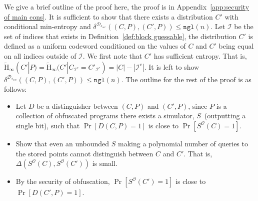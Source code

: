 \documentclass[11pt]{article}
\newcommand{\apref}[1]{\mbox{Appendix~\ref{#1}}}
\newcommand{\defref}[1]{\mbox{Definition~\ref{#1}}}
\newcommand{\ngl}{\ensuremath{\mathtt{ngl}}\xspace}
\newcommand{\Hav}{\tilde{\mathrm{H}}_\infty}
\begin{document}
We give a brief outline of the proof here, the proof is in \apref{app:security of main cons}.
It is sufficient to show that there exists a distribution $C'$ with conditional min-entropy and $\delta^{\mathcal{D}_{s_{sec}}}((C, P), (C', P))\le \ngl(n)$.  Let $\mathcal{I}$ be the set of indices that exists in \defref{def:block guessable}, the distribution $C'$ is defined as a uniform codeword conditioned on the values of $C$ and $C'$ being equal on all indices outside of $\mathcal{I}$.  We first note that $C'$ has sufficient entropy.  That is, $\Hav(C' |P) =\Hav(C' | C_{\mathcal{I}^c} = C'_{\mathcal{I}^c}) = |C| - |\mathcal{I}^c|$.  It is left to show $\delta^{\mathcal{D}_{s_{sec}}}((C, P), (C', P)) \le \ngl(n)$.
The outline for the rest of the proof is as follows:
\begin{itemize}
\item Let $D$ be a distinguisher between $(C, P)$ and $(C', P)$, since $P$ is a collection of obfuscated programs there exists a simulator, $S$~(outputting a single bit), such that $\Pr[D(C, P)=1]$ is close to $\Pr[S^{\mathcal{O}}(C)=1]$.
\item Show that even an unbounded $S$ making a polynomial number of queries to the stored points cannot distinguish between $C$ and $C'$.  That is, $\Delta(S^{\mathcal{O}}(C),S^{\mathcal{O}}(C'))$ is small.
\item By the security of obfuscation, $\Pr[S^{\mathcal{O}}(C')=1]$ is close to $\Pr[D(C', P)=1]$.
\end{itemize}
\end{document}
